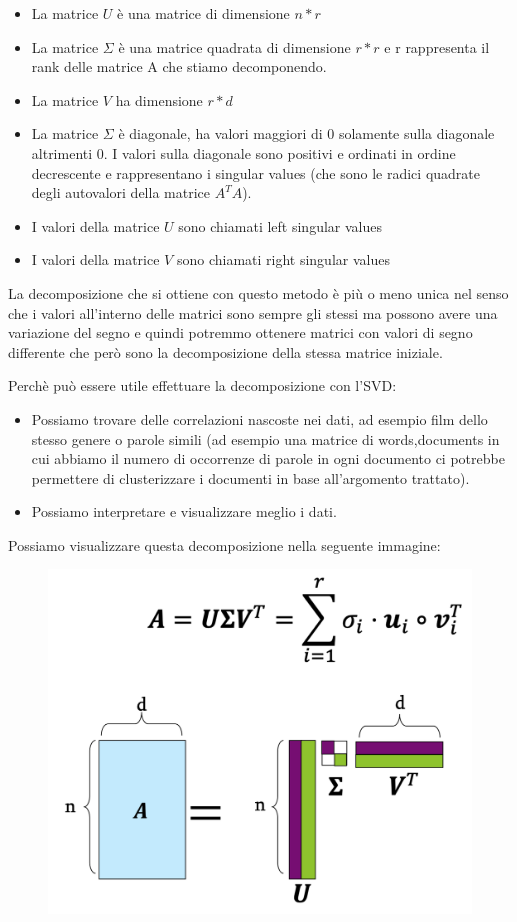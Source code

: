 \documentclass[14pt]{extreport}
\begin{document}
\begin{itemize}
	\item La matrice $U$ è una matrice di dimensione $n*r$
	\item La matrice $\Sigma$ è una matrice quadrata di dimensione $r*r$ e r rappresenta il rank delle matrice A che stiamo decomponendo.
	\item La matrice $V$ ha dimensione $r*d$
	\item La matrice $\Sigma$ è diagonale, ha valori maggiori di 0 solamente sulla diagonale altrimenti 0. 
	I valori sulla diagonale sono positivi e ordinati in ordine decrescente e rappresentano i singular values (che sono le radici
	quadrate degli autovalori della matrice $A^TA$). 
	\item I valori della matrice $U$ sono chiamati left singular values
	\item I valori della matrice $V$ sono chiamati right singular values
\end{itemize}

La decomposizione che si ottiene con questo metodo è più o meno unica nel senso che i valori all'interno delle matrici sono sempre gli stessi ma 
possono avere una variazione del segno e quindi potremmo ottenere matrici con valori di segno differente che però sono la decomposizione della stessa matrice iniziale.

Perchè può essere utile effettuare la decomposizione con l'SVD:
\begin{itemize}
	\item Possiamo trovare delle correlazioni nascoste nei dati, ad esempio film dello stesso genere o parole simili (ad esempio una matrice di words,documents 
	in cui abbiamo il numero di occorrenze di parole in ogni documento ci potrebbe permettere di clusterizzare i documenti in base all'argomento trattato). 
	\item Possiamo interpretare e visualizzare meglio i dati.
\end{itemize}

Possiamo visualizzare questa decomposizione nella seguente immagine:


\begin{figure}[H] 
\centering
\includegraphics[width=0.7\linewidth]{496.jpeg}
\end{figure}
\end{document}
